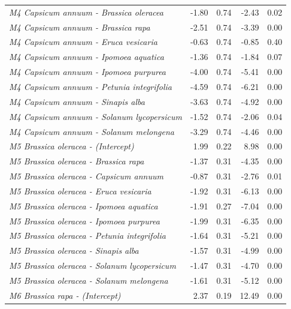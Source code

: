 \documentclass[
  12pt,
]{article}
\begin{document}
\begin{longtable}[t]{>{\em}lrrrr}
\addlinespace
M4 Capsicum annuum - Brassica oleracea & -1.80 & 0.74 & -2.43 & 0.02\\
\addlinespace
\rowcolor{gray!6}  M4 Capsicum annuum - Brassica rapa & -2.51 & 0.74 & -3.39 & 0.00\\
\addlinespace
M4 Capsicum annuum - Eruca vesicaria & -0.63 & 0.74 & -0.85 & 0.40\\
\addlinespace
\rowcolor{gray!6}  M4 Capsicum annuum - Ipomoea aquatica & -1.36 & 0.74 & -1.84 & 0.07\\
\addlinespace
M4 Capsicum annuum - Ipomoea purpurea & -4.00 & 0.74 & -5.41 & 0.00\\
\addlinespace
\rowcolor{gray!6}  M4 Capsicum annuum - Petunia integrifolia & -4.59 & 0.74 & -6.21 & 0.00\\
\addlinespace
M4 Capsicum annuum - Sinapis alba & -3.63 & 0.74 & -4.92 & 0.00\\
\addlinespace
\rowcolor{gray!6}  M4 Capsicum annuum - Solanum lycopersicum & -1.52 & 0.74 & -2.06 & 0.04\\
\addlinespace
M4 Capsicum annuum - Solanum melongena & -3.29 & 0.74 & -4.46 & 0.00\\
\addlinespace
\rowcolor{gray!6}  M5 Brassica oleracea - (Intercept) & 1.99 & 0.22 & 8.98 & 0.00\\
\addlinespace
M5 Brassica oleracea - Brassica rapa & -1.37 & 0.31 & -4.35 & 0.00\\
\addlinespace
\rowcolor{gray!6}  M5 Brassica oleracea - Capsicum annuum & -0.87 & 0.31 & -2.76 & 0.01\\
\addlinespace
M5 Brassica oleracea - Eruca vesicaria & -1.92 & 0.31 & -6.13 & 0.00\\
\addlinespace
\rowcolor{gray!6}  M5 Brassica oleracea - Ipomoea aquatica & -1.91 & 0.27 & -7.04 & 0.00\\
\addlinespace
M5 Brassica oleracea - Ipomoea purpurea & -1.99 & 0.31 & -6.35 & 0.00\\
\addlinespace
\rowcolor{gray!6}  M5 Brassica oleracea - Petunia integrifolia & -1.64 & 0.31 & -5.21 & 0.00\\
\addlinespace
M5 Brassica oleracea - Sinapis alba & -1.57 & 0.31 & -4.99 & 0.00\\
\addlinespace
\rowcolor{gray!6}  M5 Brassica oleracea - Solanum lycopersicum & -1.47 & 0.31 & -4.70 & 0.00\\
\addlinespace
M5 Brassica oleracea - Solanum melongena & -1.61 & 0.31 & -5.12 & 0.00\\
\addlinespace
\rowcolor{gray!6}  M6 Brassica rapa - (Intercept) & 2.37 & 0.19 & 12.49 & 0.00\\

\end{longtable}
\end{document}
